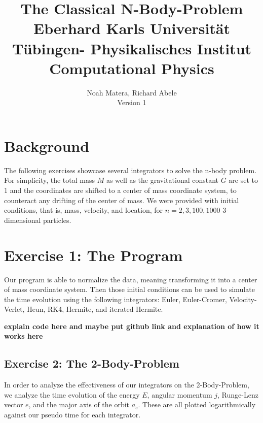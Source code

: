 \documentclass[ngerman]{article}
\title{\textbf{The Classical N-Body-Problem }\\  
Eberhard Karls Universität Tübingen- Physikalisches Institut\\ Computational Physics
}
\author{ Noah Matera, Richard Abele \\ 
Version 1
\\  }
\date{\item{Session Date Tübingen, 21.10.24}\\ \item{Hand-in Tübingen, den} \\ Wintersemester 24/25}
\begin{document}
\thispagestyle{empty}
\maketitle
\newpage

\pagestyle{fancy}                    %
\fancyhf{}                           %
\renewcommand{\headrulewidth}{0.4pt} %
\fancyfoot[C]{\thepage}              %
\renewcommand{\footrulewidth}{0pt}
\tableofcontents 
\newpage

\section{Background}
The following exercises showcase several integrators to solve the n-body problem. 
For simplicity, the total mass $M$ as well as the gravitational constant $G$ are set to 1 and the coordinates are shifted to a center of mass coordinate system, to counteract any drifting of the center of mass.
We were provided with initial conditions, that is, mass, velocity, and location, for $n=2, 3, 100, 1000$ 3-dimensional particles.

\section{Exercise 1: The Program}
Our program is able to normalize the data, meaning transforming it into a center of mass coordinate system. Then those initial conditions can be used to simulate the time evolution using the following integrators: Euler, Euler-Cromer, Velocity-Verlet, 
Heun, RK4, Hermite, and iterated Hermite.

\textbf{explain code here and maybe put github link and explanation of how it works here}


\subsection{Exercise 2: The 2-Body-Problem}  
In order to analyze the effectiveness of our integrators on the 2-Body-Problem, we analyze the time evolution of the energy $E$, angular momentum $j$, Runge-Lenz vector $e$, and the major axis of the orbit $a_e$. These are all plotted logarithmically against our pseudo time for each integrator.
\end{document}
